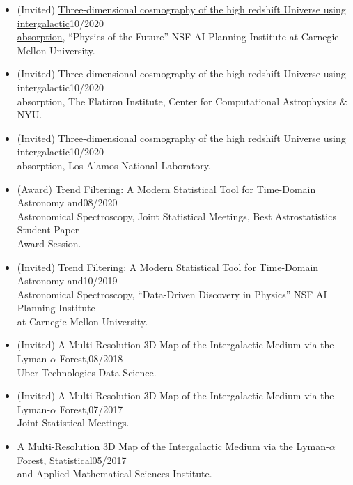 \documentclass[letterpaper,10pt]{article}
\begin{document}
\begin{itemize}[itemsep=0.25cm, leftmargin=0cm, rightmargin=0cm]
\item[] (Invited) \href{https://youtu.be/89vjQxVIDpI}{Three-dimensional cosmography of the high redshift Universe using intergalactic}\hspace*{\fill}10/2020\\  \href{https://youtu.be/89vjQxVIDpI}{absorption}, ``Physics of the Future'' NSF AI Planning Institute at Carnegie Mellon University.
\item[] (Invited) Three-dimensional cosmography of the high redshift Universe using intergalactic\hspace*{\fill}10/2020\\  absorption, The Flatiron Institute, Center for Computational Astrophysics \& NYU.
\item[] (Invited) Three-dimensional cosmography of the high redshift Universe using intergalactic\hspace*{\fill}10/2020\\  absorption, Los Alamos National Laboratory.
\item[] (Award) Trend Filtering: A Modern Statistical Tool for Time-Domain Astronomy and\hspace*{\fill}08/2020\\ Astronomical Spectroscopy, Joint Statistical Meetings, Best Astrostatistics Student Paper\\ Award Session.
\item[] (Invited) Trend Filtering: A Modern Statistical Tool for Time-Domain Astronomy and\hspace*{\fill}10/2019\\ Astronomical Spectroscopy, ``Data-Driven Discovery in Physics'' NSF AI Planning Institute\\ at Carnegie Mellon University.
\item[] (Invited) A Multi-Resolution 3D Map of the Intergalactic Medium via the Lyman-$\alpha$ Forest,\hspace*{\fill}08/2018\\ Uber Technologies Data Science.
\item[] (Invited) A Multi-Resolution 3D Map of the Intergalactic Medium via the Lyman-$\alpha$ Forest,\hspace*{\fill}07/2017\\ Joint Statistical Meetings.
\item[] A Multi-Resolution 3D Map of the Intergalactic Medium via the Lyman-$\alpha$ Forest, Statistical\hspace*{\fill}05/2017\\ and Applied Mathematical Sciences Institute.

\end{itemize}
\end{document}

